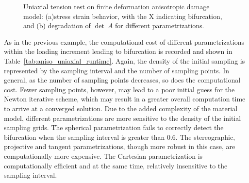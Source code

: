 \documentclass[12pt]{article}
\numberwithin{equation}{section}
\begin{document}
\begin{figure}[htbp]
  \centering {} 
  \caption{Uniaxial tension test on finite deformation anisotropic
    damage model: (a)stress strain behavior, with the X indicating
    bifurcation, and (b) degradation of $\det~A$ for different
    parametrizations.}
  \label{fig:aniso_stress_stretch}
\end{figure}

As in the previous example, the computational cost of different
parametrizations within the loading increment leading to bifurcation
is recorded and shown in
Table~\ref{tab:aniso_uniaxial_runtime}. Again, the density of the
initial sampling is represented by the sampling interval and the
number of sampling points. In general, as the number of sampling
points decreases, so does the computational cost.  Fewer sampling
points, however, may lead to a poor initial guess for the Newton
iterative scheme, which may result in a greater overall computation
time to arrive at a converged solution. Due to the added complexity of
the material model, different parametrizations are more sensitive to
the density of the initial sampling grids. The spherical
parametrization fails to correctly detect the bifurcation when the
sampling interval is greater than 0.6. The stereographic, projective
and tangent parametrizations, though more robust in this case, are
computationally more expensive.  The Cartesian parametrization is
computationally efficient and at the same time, relatively insensitive
to the sampling interval.
\end{document}
